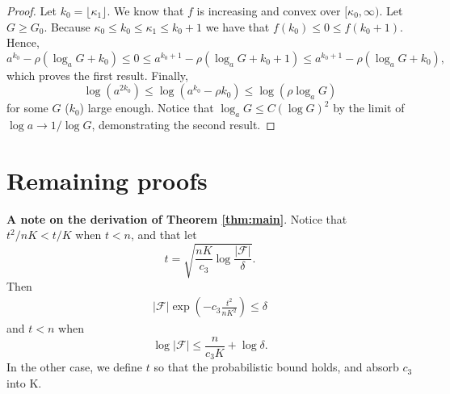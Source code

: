 \begin{proof}
Let $k_0 = \lfloor \kappa_1 \rfloor$.
We know that $f$ is increasing and convex over $[\kappa_0,\infty)$.
Let $G \ge G_0$.
Because $\kappa_0 \le k_0 \le \kappa_1 \le k_0 + 1$ we have that $f(k_0) \le 0 \le f(k_0 + 1)$.
Hence,
\begin{equation*}
    a^{k_0} - \rho (\log_a G + k_0) \le 0 \le a^{k_0 + 1} - \rho (\log_a G + k_0 + 1) \le a^{k_0 + 1} - \rho (\log_a G + k_0),
\end{equation*}
which proves the first result.
Finally, 
$$
\log(a^{2 k_0}) \le \log\left( a^{k_0} - \rho k_0 \right) \le \log(\rho \log_a G)
$$
for some $G$ ($k_0$) large enough.
Notice that $\log_aG \le C (\log G)^2$ by the limit of $\log a \rightarrow 1 / \log G$, demonstrating the second result.
\end{proof}

\section{Remaining proofs}

{\bf A note on the derivation of Theorem \ref{thm:main}}.
Notice that $t^2 / nK < t/K$ when $t < n$, and that let
$$
t = \sqrt{\frac{nK}{c_3} \log \frac{|\mathcal F|}{\delta}}.
$$
Then
\begin{align*}
    |\mathcal F| \exp \left( - c_3 \frac{t^2}{nK^2} \right) \le \delta
\end{align*}
and $t < n$ when 
$$
\log |\mathcal F| \le \frac{n}{c_3 K} + \log \delta.
$$
In the other case, we define $t$ so that the probabilistic bound holds, and absorb $c_3$ into K.


